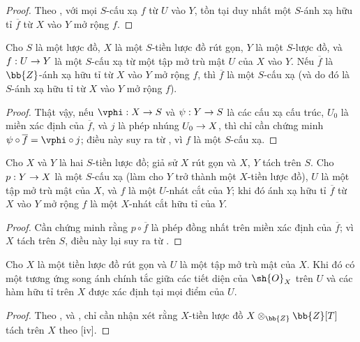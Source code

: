 \documentclass[oneside]{amsart}
\makeatletter
\newcommand{\ega@arrow}[2]{\mathchoice{#1}{#2}{#2}{#2}}
\renewcommand{\to}{\ega@arrow{\longrightarrow}{\rightarrow}}
\newcommand{\oldpage}[2][]{{\marginnote{\normalfont\textbf{#1}~|~#2}}\ignorespaces}
\let\EGAOriginalLabel\label
\renewcommand{\label}[1]{\phantomsection\EGAOriginalLabel{#1}}
\makeatother
\begin{document}
\begin{proof}
Theo , với mọi $S$-cấu xạ $f$ từ $U$ vào $Y$, tồn tại duy nhất một $S$-ánh xạ hữu tỉ $\overline{f}$ từ $X$ vào $Y$ mở rộng $f$.
\end{proof}

\begin{corollary}[7.2.4]
\label{I.7.2.4}
Cho $S$ là một lược đồ, $X$ là một $S$-tiền lược đồ rút gọn, $Y$ là một $S$-lược đồ, và $f:U\to Y$ là một $S$-cấu xạ từ một tập mở trù mật $U$ của $X$ vào $Y$.
Nếu $\overline{f}$ là $\bb{Z}$-ánh xạ hữu tỉ từ $X$ vào $Y$ mở rộng $f$, thì $\overline{f}$ là một $S$-cấu xạ (và do đó là $S$-ánh xạ hữu tỉ từ $X$ vào $Y$ mở rộng $f$).
\end{corollary}

\begin{proof}
Thật vậy, nếu $\vphi:X\to S$ và $\psi:Y\to S$ là các cấu xạ cấu trúc, $U_0$ là miền xác định của $\overline{f}$, và $j$ là phép nhúng $U_0\to X$, thì chỉ cần chứng minh $\psi\circ\overline{f}=\vphi\circ j$; điều này suy ra từ , vì $f$ là một $S$-cấu xạ.
\end{proof}

\begin{corollary}[7.2.5]
\label{I.7.2.5}
Cho $X$ và $Y$ là hai $S$-tiền lược đồ; giả sử $X$ rút gọn và $X$, $Y$ tách trên $S$.
Cho $p:Y\to X$ là một $S$-cấu xạ (làm cho $Y$ trở thành một $X$-tiền lược đồ), $U$ là một tập mở trù mật của $X$, và $f$ là một $U$-nhát cắt của $Y$; khi đó ánh xạ hữu tỉ $\overline{f}$ từ $X$ vào $Y$ mở rộng $f$ là một $X$-nhát cắt hữu tỉ của $Y$.
\end{corollary}

\oldpage[I]{160}
\begin{proof}
Cần chứng minh rằng $p\circ\overline{f}$ là phép đồng nhất trên miền xác định của $\overline{f}$; vì $X$ tách trên $S$, điều này lại suy ra từ .
\end{proof}

\begin{corollary}[7.2.6]
\label{I.7.2.6}
Cho $X$ là một tiền lược đồ rút gọn và $U$ là một tập mở trù mật của $X$.
Khi đó có một tương ứng song ánh chính tắc giữa các tiết diện của $\sh{O}_X$ trên $U$ và các hàm hữu tỉ trên $X$ được xác định tại mọi điểm của $U$.
\end{corollary}

\begin{proof}
Theo ,  và , chỉ cần nhận xét rằng $X$-tiền lược đồ $X\otimes_{\bb{Z}}\bb{Z}[T]$ tách trên $X$ theo [iv].
\end{proof}
\end{document}
